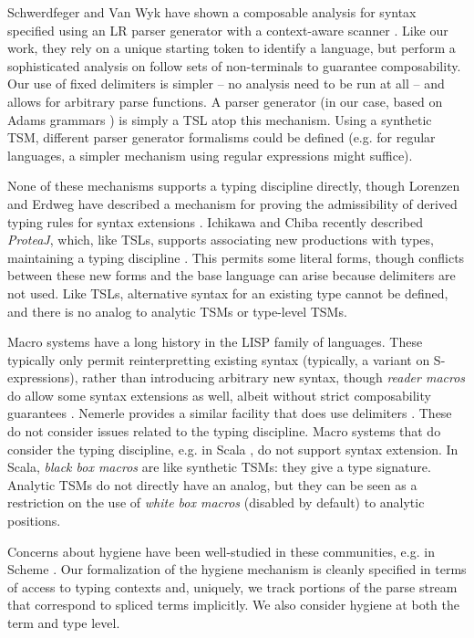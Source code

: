 \documentclass{sig-alternate}
\begin{document}
Schwerdfeger and Van Wyk have shown a composable analysis for syntax specified using an LR parser generator with a context-aware scanner \cite{conf/pldi/SchwerdfegerW09}. Like our work, they rely on a unique starting token to identify a language, but perform a sophisticated analysis on follow sets of non-terminals to guarantee composability. Our use of fixed delimiters is simpler -- no analysis need to be run at all -- and allows for arbitrary parse functions. A parser generator (in our case, based on Adams grammars \cite{Adams:2013:PPI:2429069.2429129}) is simply a TSL atop this mechanism. Using a synthetic TSM, different parser generator formalisms could be defined (e.g. for regular languages, a simpler mechanism using regular expressions might suffice).

None of these mechanisms supports a typing discipline directly, though Lorenzen and Erdweg have described a mechanism for proving the admissibility of derived typing rules for syntax extensions \cite{conf/icfp/LorenzenE13}. Ichikawa and Chiba recently described \emph{ProteaJ}, which, like TSLs, supports associating new productions with types, maintaining a typing discipline \cite{Ichikawa:2014:CUO:2577080.2577092}. This permits some literal forms, though conflicts between these new forms and the base language can arise because delimiters are not used. Like TSLs, alternative syntax for an existing type cannot be defined, and there is no analog to analytic TSMs or type-level TSMs.

Macro systems have a long history in the LISP family of languages. These typically only permit reinterpretting existing syntax (typically, a variant on S-expressions), rather than introducing arbitrary new syntax, though \emph{reader macros} do allow some syntax extensions as well, albeit without strict composability guarantees \cite{steele1990common}. Nemerle provides a similar facility that does use delimiters \cite{skalski2004meta}. These do not consider issues related to the typing discipline. Macro systems that do consider the typing discipline, e.g. in Scala \cite{ScalaMacros2013}, do not support syntax extension. In Scala, \emph{black box macros} are like synthetic TSMs: they give a type signature. Analytic TSMs do not directly have an analog, but they can be seen as a restriction on the use of \emph{white box macros} (disabled by default) to analytic positions. 

Concerns about hygiene have been well-studied in these communities, e.g. in Scheme \cite{Dybvig:1992:SAS:173617.173620}. 
Our formalization of the hygiene mechanism is cleanly specified in terms of access to typing contexts and, uniquely, we track portions of the parse stream that correspond to spliced terms implicitly. We also consider hygiene at both the term and type level.
\end{document}
